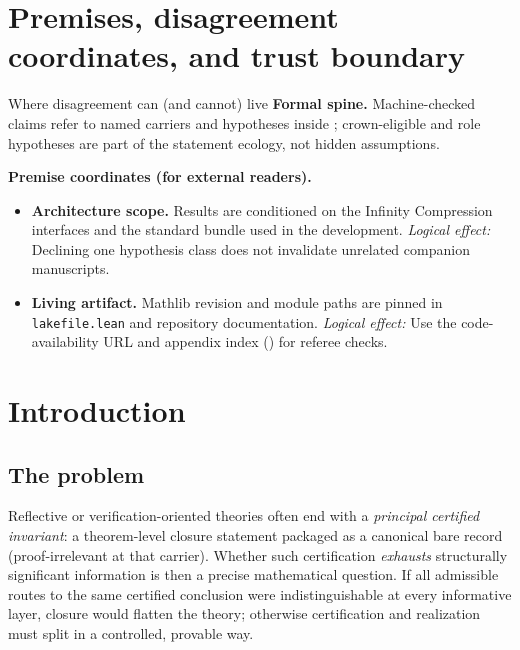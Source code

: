 \documentclass[11pt]{article}
\begin{document}
\section{Premises, disagreement coordinates, and trust boundary}\label{sec:premises-ic-flagship}
\begin{keybox}{Where disagreement can (and cannot) live}
\textbf{Formal spine.}
Machine-checked claims refer to named carriers and hypotheses inside ; crown-eligible and role hypotheses are part of the statement ecology, not hidden assumptions.

\medskip
\textbf{Premise coordinates (for external readers).}
{\raggedright
\begin{itemize}[leftmargin=2em]
\item \textbf{Architecture scope.} Results are conditioned on the Infinity Compression interfaces and the standard bundle used in the development.
  \emph{Logical effect:} Declining one hypothesis class does not invalidate unrelated companion manuscripts.
\item \textbf{Living artifact.} Mathlib revision and module paths are pinned in \texttt{lakefile.lean} and repository documentation.
  \emph{Logical effect:} Use the code-availability URL and appendix index () for referee checks.
\end{itemize}
\par}
\end{keybox}

\tableofcontents
\newpage

\section{Introduction}\label{sec:intro}

\subsection{The problem}\label{sec:intro-problem}
Reflective or verification-oriented theories often end with a \emph{principal certified invariant}: a theorem-level closure statement packaged as a canonical bare record (proof-irrelevant at that carrier). Whether such certification \emph{exhausts} structurally significant information is then a precise mathematical question. If all admissible routes to the same certified conclusion were indistinguishable at every informative layer, closure would flatten the theory; otherwise certification and realization must split in a controlled, provable way.
\end{document}
